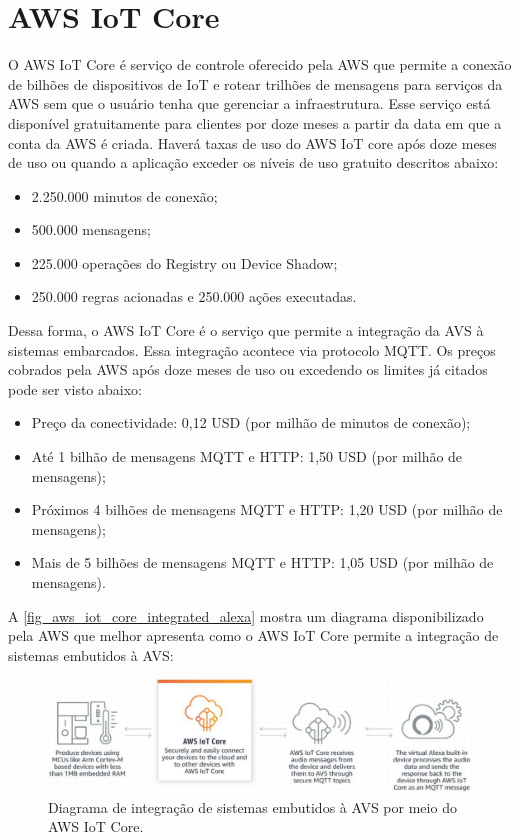 \section{AWS IoT Core}\label{section_aws_iot_core}
O AWS IoT Core é serviço de controle oferecido pela AWS que permite a conexão de bilhões de dispositivos de IoT e rotear trilhões de mensagens para serviços da AWS sem que o usuário tenha que gerenciar a infraestrutura. Esse serviço está disponível gratuitamente para clientes por doze meses a partir da data em que a conta da AWS é criada. Haverá taxas de uso do AWS IoT core após doze meses de uso ou quando a aplicação exceder os níveis de uso gratuito descritos abaixo:
\begin{itemize}
	\item 2.250.000 minutos de conexão;
	\item 500.000 mensagens;
	\item 225.000 operações do Registry ou Device Shadow;
	\item 250.000 regras acionadas e 250.000 ações executadas.
\end{itemize}

Dessa forma, o AWS IoT Core é o serviço que permite a integração da AVS à sistemas embarcados. Essa integração acontece via protocolo MQTT. Os preços cobrados pela AWS após doze meses de uso ou excedendo os limites já citados pode ser visto abaixo:
\begin{itemize}
	\item Preço da conectividade: 0,12 USD (por milhão de minutos de conexão);
	\item Até 1 bilhão de mensagens MQTT e HTTP: 1,50 USD (por milhão de mensagens);
	\item Próximos 4 bilhões de mensagens MQTT e HTTP: 1,20 USD (por milhão de mensagens);
	\item Mais de 5 bilhões de mensagens MQTT e HTTP: 1,05 USD (por milhão de mensagens).
\end{itemize}

A \autoref{fig_aws_iot_core_integrated_alexa} mostra um diagrama disponibilizado pela AWS que melhor apresenta como o AWS IoT Core permite a integração de sistemas embutidos à AVS:
\begin{figure}[htb]
	\caption{Diagrama de integração de sistemas embutidos à AVS por meio do AWS IoT Core.}
	\begin{center}
		\includegraphics[scale=0.5]{Imagens/aws_iot_core_integrated_alexa.pdf}
	\end{center}
	\label{fig_aws_iot_core_integrated_alexa}
\end{figure}

